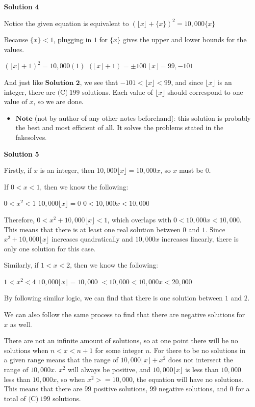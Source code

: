 \begin{enumerate}
 



\textbf{Solution 4}

Notice the given equation is equivalent to $(\lfloor x \rfloor+\{x\})^2=10,000\{x\}$

 Because $\{x\} < 1$, plugging in $1$ for $\{x\}$ gives the upper and lower bounds for the values.

 $(\lfloor x \rfloor +1)^2 = 10,000(1)$
$(\lfloor x \rfloor +1) = \pm 100$
$\lfloor x \rfloor = 99, -101$

 And just like $\textbf{Solution 2}$, we see that $-101 < \lfloor x \rfloor < 99$, and since $\lfloor x \rfloor$ is an integer, there are $\boxed{\text{(C)}~199}$ solutions. Each value of $\lfloor x \rfloor$ should correspond to one value of $x$, so we are done.

 
            \begin{itemize}
        \item $\textbf{Note}$ (not by author of any other notes beforehand): this solution is probably the best and most efficient of all. It solves the problems stated in the fakesolves.
            \end{itemize}
            



\textbf{Solution 5}

Firstly, if $x$ is an integer, then $10,000\lfloor x \rfloor=10,000x$, so $x$ must be $0$.

 If $0<x<1$, then we know the following:

 $0<x^2<1$
$10,000\lfloor x \rfloor =0$
$0<10,000x<10,000$

 Therefore, $0<x^2+10,000\lfloor x \rfloor <1$, which overlaps with $0<10,000x<10,000$. This means that there is at least one real solution between $0$ and $1$. Since $x^2+10,000\lfloor x \rfloor$ increases quadratically and $10,000x$ increases linearly, there is only one solution for this case. 

 Similarly, if $1<x<2$, then we know the following:

 $1<x^2<4$
$10,000\lfloor x \rfloor =10,000$
$<10,000<10,000x<20,000$

 By following similar logic, we can find that there is one solution between $1$ and $2$. 

 We can also follow the same process to find that there are negative solutions for $x$ as well.

 There are not an infinite amount of solutions, so at one point there will be no solutions when $n<x<n+1$ for some integer $n$. For there to be no solutions in a given range means that the range of $10,000\lfloor x \rfloor + x^2$ does not intersect the range of $10,000x$. $x^2$ will always be positive, and $10,000\lfloor x \rfloor$ is less than $10,000$ less than $10,000x$, so when $x^2 >= 10,000$, the equation will have no solutions. This means that there are $99$ positive solutions, $99$ negative solutions, and $0$ for a total of $\boxed{\text{(C)}~199}$ solutions.


\end{enumerate}

